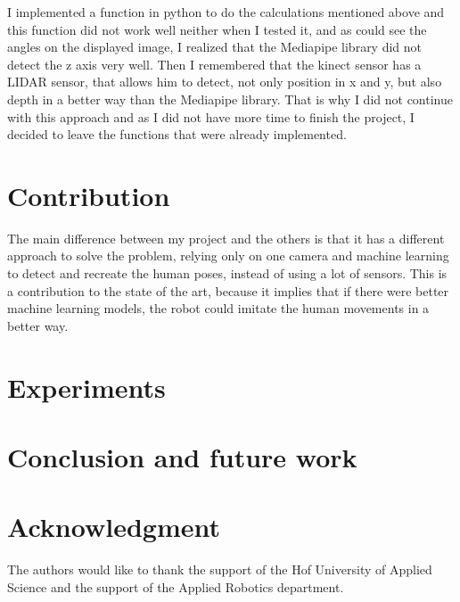 \documentclass[conference]{IEEEtran}
\begin{document}
I implemented a function in python to do the calculations mentioned above and this function did not work well neither when I tested it, and as could see the angles on the displayed image, I realized that the Mediapipe library did not detect the z axis very well. Then I remembered that the kinect sensor has a LIDAR sensor, that allows him to detect, not only position in x and y, but also depth in a better way than the Mediapipe library. 
That is why I did not continue with this approach and as I did not have more time to finish the project, I decided to leave the functions that were already implemented.

\section{Contribution}
The main difference between my project and the others is that it has a different approach to solve the problem, relying only on one camera and machine learning to detect and recreate the human poses, instead of using a lot of sensors. This is a contribution to the state of the art, because it implies that if there were better machine learning models, the robot could imitate the human movements in a better way. 


\section{Experiments}







\section{Conclusion and future work}

\section*{Acknowledgment}

The authors would like to thank the support of the Hof University of Applied Science and the support of the Applied Robotics department.

\end{document}
